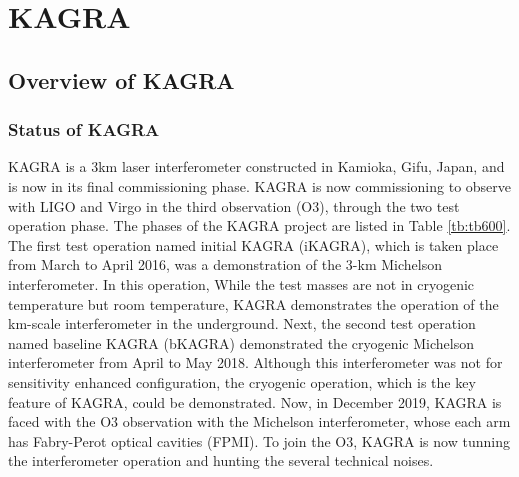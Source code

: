 \chapter{KAGRA}
\section{Overview of KAGRA}
\subsection{Status of KAGRA}
KAGRA is a 3km laser interferometer constructed in Kamioka, Gifu, Japan, and is now in its final commissioning phase. KAGRA is now commissioning to observe with LIGO and Virgo in the third observation (O3), through the two test operation phase. The phases of the KAGRA project are listed in Table \ref{tb:tb600}. The first test operation named initial KAGRA (iKAGRA), which is taken place from March to April 2016, was a demonstration of the 3-km Michelson interferometer. In this operation, While the test masses are not in cryogenic temperature but room temperature, KAGRA demonstrates the operation of the km-scale interferometer in the underground. Next, the second test operation named baseline KAGRA (bKAGRA) demonstrated the cryogenic Michelson interferometer from April to May 2018. Although this interferometer was not for sensitivity enhanced configuration, the cryogenic operation, which is the key feature of KAGRA, could be demonstrated. Now, in December 2019, KAGRA is faced with the O3 observation with the Michelson interferometer, whose each arm has Fabry-Perot optical cavities (FPMI). To join the O3, KAGRA is now tunning the interferometer operation and hunting the several technical noises.
